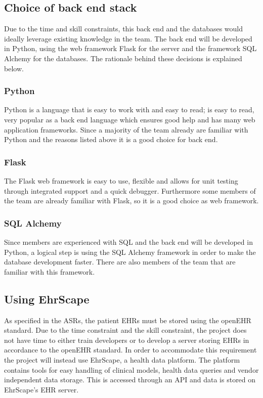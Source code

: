 \documentclass{article}
\begin{document}
\subsection{Choice of back end stack}
Due to the time and skill constraints, this back end and the databases would ideally leverage existing knowledge in the team. The back end will be developed in Python, using the web framework Flask for the server and the framework SQL Alchemy for the databases. The rationale behind these decisions is explained below.

\subsubsection{Python}
Python is a language that is easy to work with and easy to read; is easy to read, very popular as a back end language which ensures good help and has many web application frameworks. Since a majority of the team already are familiar with Python and the reasons listed above it is a good choice for back end. 
\subsubsection{Flask}
The Flask web framework is easy to use, flexible and allows for unit testing through integrated support and a quick debugger. Furthermore some members of the team are already familiar with Flask, so it is a good choice as web framework.
\subsubsection{SQL Alchemy}
Since members are experienced with SQL and the back end will be developed in Python, a logical step is using the SQL Alchemy framework in order to make the database development faster. There are also members of the team that are familiar with this framework.

\subsection{Using EhrScape}
As specified in the ASRs, the patient EHRs must be stored using the openEHR standard. Due to the time constraint and the skill constraint, the project does not have time to either train developers or to develop a server storing EHRs in accordance to the openEHR standard. In order to accommodate this requirement the project will instead use EhrScape, a health data platform. The platform contains tools for easy handling of clinical models, health data queries and vendor independent data storage. This is accessed through an API and data is stored on EhrScape's EHR server.
\end{document}
